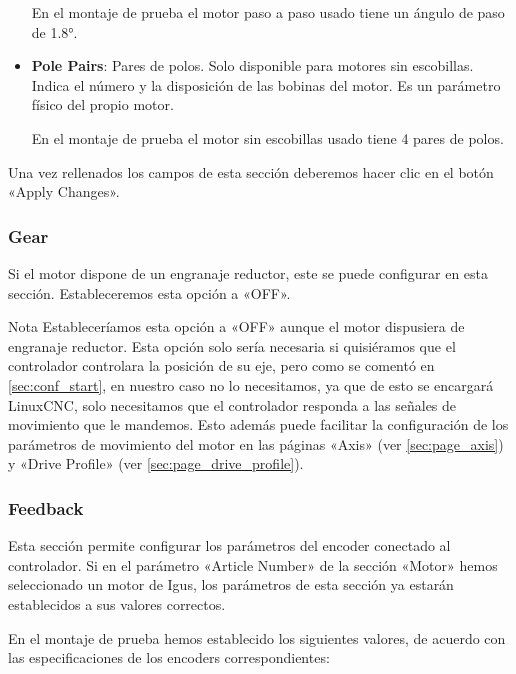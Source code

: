 \documentclass[english,spanish,a4paper,11pt]{article}
\begin{document}
\begin{itemize}
    En el montaje de prueba el motor paso a paso usado tiene un ángulo de paso de \ang{1.8}.

    \item \textbf{Pole Pairs}: Pares de polos. Solo disponible para motores sin escobillas. Indica el número y la disposición de las bobinas del motor. Es un parámetro físico del propio motor.

    En el montaje de prueba el motor sin escobillas usado tiene 4 pares de polos.
\end{itemize}


Una vez rellenados los campos de esta sección deberemos hacer clic en el botón «Apply Changes».


\subsubsection{Gear}

Si el motor dispone de un engranaje reductor, este se puede configurar en esta sección. Estableceremos esta opción a «OFF».

\begin{admonition}{Nota}
    Estableceríamos esta opción a «OFF» aunque el motor dispusiera de engranaje reductor. Esta opción solo sería necesaria si quisiéramos que el controlador controlara la posición de su eje, pero como se comentó en \cref{sec:conf_start}, en nuestro caso no lo necesitamos, ya que de esto se encargará LinuxCNC, solo necesitamos que el controlador responda a las señales de movimiento que le mandemos. Esto además puede facilitar la configuración de los parámetros de movimiento del motor en las páginas «Axis» (ver \cref{sec:page_axis}) y «Drive Profile» (ver \cref{sec:page_drive_profile}).
\end{admonition}

\subsubsection{Feedback}

Esta sección permite configurar los parámetros del encoder conectado al controlador. Si en el parámetro «Article Number» de la sección «Motor» hemos seleccionado un motor de Igus, los parámetros de esta sección ya estarán establecidos a sus valores correctos.

En el montaje de prueba hemos establecido los siguientes valores, de acuerdo con las especificaciones de los encoders correspondientes:
\end{document}
